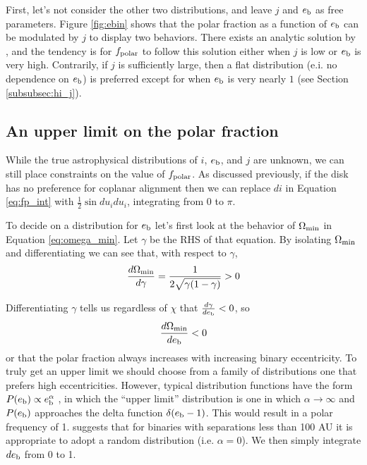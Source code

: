 \documentclass[twocolumn]{aastex631}
\begin{document}
First, let's not consider the other two distributions, and leave $j$ and $e_{\rm b}$ as free parameters. Figure \ref{fig:ebin} shows that the polar fraction
as a function of $e_{\rm b}$ can be modulated by $j$ to display two behaviors. There exists an analytic solution by \citet{zanazzi2018}, and the tendency is
for $f_{\rm polar}$ to follow this solution either when $j$ is low or $e_{\rm b}$ is very high. Contrarily, if $j$ is sufficiently large, then a flat distribution
(e.i. no dependence on $e_{\rm b}$) is preferred except for when $e_{\rm b}$ is very nearly $1$ (see Section \ref{subsubsec:hi_j}).

\subsection{An upper limit on the polar fraction}
\label{subsec:fp_limit}
While the true astrophysical distributions of $i$, $e_{\rm b}$, and $j$ are unknown, we can still place constraints on the value of $f_{\rm polar}$.
As discussed previously, if the disk has no preference for coplanar alignment then we can replace $di$ in Equation \ref{eq:fp_int} with $\frac{1}{2}\sin{du_i}du_i$, integrating
from 0 to $\pi$.

To decide on a distribution for $e_{\rm b}$ let's first look at the behavior of $\Omega_{\rm min}$ in Equation \ref{eq:omega_min}. Let $\gamma$
be the RHS of that equation. By isolating $\Omega_{\rm min}$ and differentiating we can see that, with respect to $\gamma$,
\begin{equation}
    \frac{d\Omega_{\rm min}}{d \gamma} = \frac{1}{2\sqrt{ \gamma (1 - \gamma)}} > 0
\end{equation}

Differentiating $\gamma$ tells us regardless of $\chi$ that $\frac{d\gamma}{de_{\rm b}} < 0$, so
\begin{equation}
    \frac{d\Omega_{\rm min}}{de_{\rm b}} < 0
\end{equation}
or that the polar fraction always increases with increasing binary eccentricity.
To truly get an upper limit we should choose from a family of distributions one that prefers high eccentricities. However, typical distribution
functions have the form $P(e_{\rm b}) \propto e_{\rm b}^\alpha$ \citep[e.g.][]{hwang2022,ceppi2024}, in which the ``upper limit'' distribution
is one in which $\alpha \rightarrow \infty$ and $P(e_{\rm b})$ approaches the delta function $\delta(e_{\rm b} - 1)$. This would result in a polar frequency
of 1. \citet{hwang2022} suggests that for binaries with separations less than 100 AU it is appropriate to adopt a random distribution (i.e. $\alpha=0$). We then simply
integrate $de_{\rm b}$ from 0 to 1.
\end{document}
